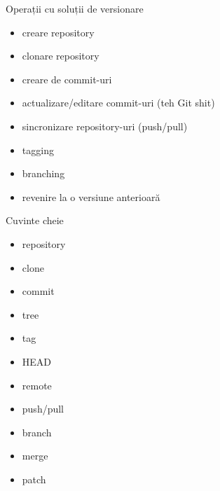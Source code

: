 \documentclass{beamer}
\begin{document}
\begin{frame}{Operații cu soluții de versionare}
  \begin{itemize}
    \item creare repository
    \item clonare repository
    \item creare de commit-uri
    \item actualizare/editare commit-uri (teh Git shit)
    \item sincronizare repository-uri (push/pull)
    \item tagging
    \item branching
    \item revenire la o versiune anterioară
  \end{itemize}
\end{frame}

\begin{frame}{Cuvinte cheie}
  \begin{itemize}
    \item repository
    \item clone
    \item commit
    \item tree
    \item tag
    \item HEAD
    \item remote
    \item push/pull
    \item branch
    \item merge
    \item patch
  \end{itemize}
\end{frame}
\end{document}
